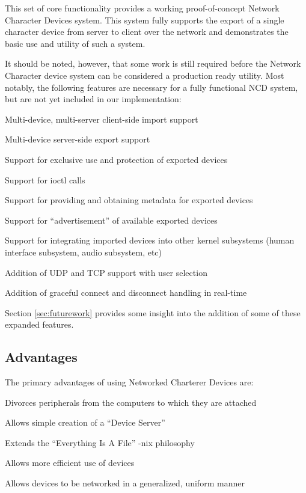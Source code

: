 \documentclass[11pt,twocolumn]{article}
\newenvironment{packed_item}{
\begin{itemize}
  \setlength{\itemsep}{1pt}
  \setlength{\parskip}{0pt}
  \setlength{\parsep}{0pt}
}{\end{itemize}}
\begin{document}
This set of core functionality provides a working proof-of-concept
Network Character Devices system. This system fully supports the
export of a single character device from server to client over the
network and demonstrates the basic use and utility of such a system.

It should be noted, however, that some work is still required before
the Network Character device system can be considered a production
ready utility. Most notably, the following features are necessary for
a fully functional NCD system, but are not yet included in our
implementation:

\begin{packed_item}
\item Multi-device, multi-server client-side import support
\item Multi-device server-side export support
\item Support for exclusive use and protection of exported devices
\item Support for ioctl calls
\item Support for providing and obtaining metadata for exported
  devices
\item Support for ``advertisement'' of available exported devices
\item Support for integrating imported devices into other kernel
  subsystems (human interface subsystem, audio subsystem, etc)
\item Addition of UDP and TCP support with user selection
\item Addition of graceful connect and disconnect handling in real-time
\end{packed_item}

Section \ref{sec:futurework} provides some insight into the addition
of some of these expanded features.

\subsection{Advantages}
\label{sec:advantages}

The primary advantages of using Networked Charterer Devices are:

\begin{packed_item}
\item Divorces peripherals from the computers to which they are
  attached
\item Allows simple creation of a ``Device Server''
\item Extends the ``Everything Is A File'' -nix philosophy
\item Allows more efficient use of devices
\item Allows devices to be networked in a generalized, uniform manner
\end{packed_item}
\end{document}
